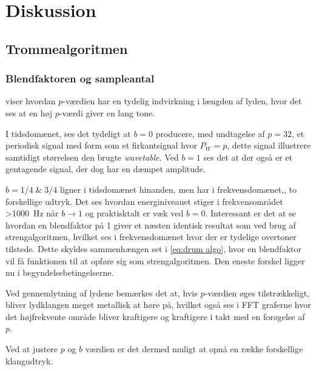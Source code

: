 \section{Diskussion}


\subsection{Trommealgoritmen}

\subsubsection{Blendfaktoren og sampleantal}


 viser hvordan $p$-værdien har en tydelig indvirkning i længden af lyden, hvor det ses at en høj $p$-værdi giver en lang tone.

I tidsdomænet, ses det tydeligt at $b=0$ producere, med undtagelse af $p=32$, et periodisk signal med form som et firkantsignal hvor $P_W = p$, dette signal illustrere samtidigt størrelsen den brugte \emph{wavetable}. Ved $b=1$ ses det at der også er et gentagende signal, der dog har en dæmpet amplitude.

$b=1/4 \; \& \; 3/4$ ligner i tidsdomænet hinanden, men har i frekvensdomænet,, to forskellige udtryk. Det ses hvordan energiniveauet stiger i frekvensområdet \SI{>1000}{Hz} når $b \to 1$ og praktisktalt er væk ved $b=0$. Interessant er det at se hvordan en blendfaktor på 1 giver et næsten identisk resultat som ved brug af strengalgoritmen, hvilket ses i frekvensdomænet hvor der er tydelige overtoner tilstede. Dette skyldes sammenhængen set i \eqref{eq:drum algo}, hvor en blendfaktor vil få funktionen til at opføre sig som strengalgoritmen. Den eneste forskel ligger nu i begyndelsebetingelserne.

Ved gennemlytning af lydene bemærkes det at, hvis $p$-værdien øges tilstrækkeligt, bliver lydklangen meget metallisk at høre på, hvilket også ses i FFT graferne hvor det højfrekvente område bliver kraftigere og kraftigere i takt med en forøgelse af $p$.

Ved at justere $p$ og $b$ værdien er det dermed muligt at opnå en række forskellige klangudtryk.